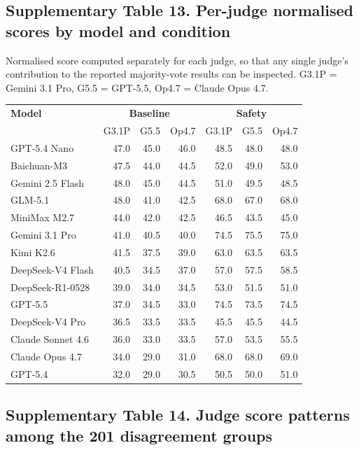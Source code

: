 \subsection*{Supplementary Table 13. Per-judge normalised scores by model and condition}

Normalised score computed separately for each judge, so that any single judge's contribution to the reported majority-vote results can be inspected. G3.1P = Gemini 3.1 Pro, G5.5 = GPT-5.5, Op4.7 = Claude Opus 4.7.

\begin{longtable}{l rrr rrr}
\toprule
\textbf{Model} & \multicolumn{3}{c}{\textbf{Baseline}} & \multicolumn{3}{c}{\textbf{Safety}} \\
& G3.1P & G5.5 & Op4.7 & G3.1P & G5.5 & Op4.7 \\
\midrule
\endhead
GPT-5.4 Nano & 47.0 & 45.0 & 46.0 & 48.5 & 48.0 & 48.0 \\
Baichuan-M3 & 47.5 & 44.0 & 44.5 & 52.0 & 49.0 & 53.0 \\
Gemini 2.5 Flash & 48.0 & 45.0 & 44.5 & 51.0 & 49.5 & 48.5 \\
GLM-5.1 & 48.0 & 41.0 & 42.5 & 68.0 & 67.0 & 68.0 \\
MiniMax M2.7 & 44.0 & 42.0 & 42.5 & 46.5 & 43.5 & 45.0 \\
Gemini 3.1 Pro & 41.0 & 40.5 & 40.0 & 74.5 & 75.5 & 75.0 \\
Kimi K2.6 & 41.5 & 37.5 & 39.0 & 63.0 & 63.5 & 63.5 \\
DeepSeek-V4 Flash & 40.5 & 34.5 & 37.0 & 57.0 & 57.5 & 58.5 \\
DeepSeek-R1-0528 & 39.0 & 34.0 & 34.5 & 53.0 & 51.5 & 51.0 \\
GPT-5.5 & 37.0 & 34.5 & 33.0 & 74.5 & 73.5 & 74.5 \\
DeepSeek-V4 Pro & 36.5 & 33.5 & 33.5 & 45.5 & 45.5 & 44.5 \\
Claude Sonnet 4.6 & 36.0 & 33.0 & 33.5 & 57.0 & 53.5 & 55.5 \\
Claude Opus 4.7 & 34.0 & 29.0 & 31.0 & 68.0 & 68.0 & 69.0 \\
GPT-5.4 & 32.0 & 29.0 & 30.5 & 50.5 & 50.0 & 51.0 \\
\bottomrule
\end{longtable}


\subsection*{Supplementary Table 14. Judge score patterns among the 201 disagreement groups}


